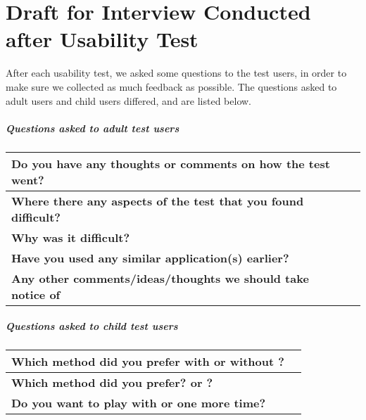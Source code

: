 \chapter{Draft for Interview Conducted after Usability Test}
\label{app:interviewafter}

After each usability test, we asked some questions to the test users, in order to make sure we collected as much feedback as possible. The questions asked to adult users and child users differed, and are listed below.

\paragraph{Questions asked to adult test users}

\begin{center}
	\begin{tabular}{ | p{5.0cm} | p{10.0cm} | }
	\hline
	\textbf{Do you have any thoughts or comments on how the test went?} & \\[5ex]  \hline
	\textbf{Where there any aspects of the test that you found difficult?} & \\[5ex] \hline
	\textbf{Why was it difficult?} & \\[5ex]  \hline
	\textbf{Have you used any similar application(s) earlier?} & \\[5ex] \hline
	\textbf{Any other comments/ideas/thoughts we should take notice of} & \\[5ex] \hline
	\end{tabular}
\end{center}


\paragraph{Questions asked to child test users}

\begin{center}
	\begin{tabular}{ | p{5.0cm} | p{10.0cm} | }
	\hline
	\textbf{Which method did you prefer with or without \ab{}?} & \\[5ex] \hline
	\textbf{Which method did you prefer? \app{} or \ab{}?} & \\[5ex] \hline
	\textbf{Do you want to play with \app{} or \ab{} one more time?} & \\[5ex] \hline
	\end{tabular}
\end{center}